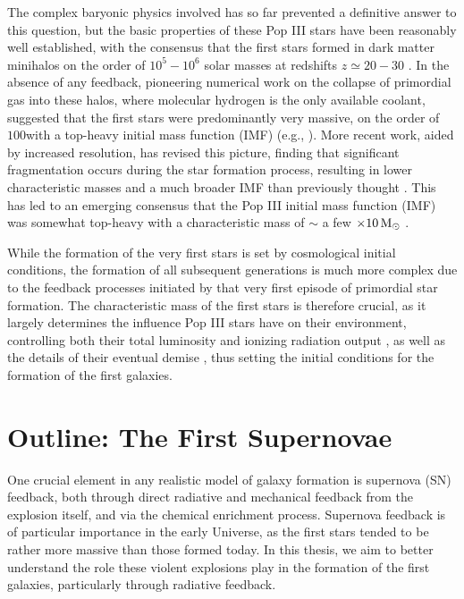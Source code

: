 \documentclass[../thesis.tex]{subfiles}
\begin{document}
The complex baryonic physics involved has so far prevented a definitive answer to this question, but the basic properties of these Pop III stars have been reasonably well established, with the consensus that the first stars formed in dark matter minihalos on the order of $10^5-10^6$ solar masses at redshifts $z \simeq 20-30$ \citep{CouchmanRees1986,   HaimanThoulLoeb1996, Tegmarketal1997}.  
In the absence of any feedback, pioneering numerical work on the collapse of primordial gas into these halos, where molecular hydrogen is the only available coolant, suggested that the first stars were predominantly very massive, on the order of $100$\msun with a top-heavy initial mass function (IMF) (e.g., \citealt{BrommCoppiLarson1999, BrommCoppiLarson2002, AbelBryanNorman2002, BrommLarson2004, Yoshidaetal2006, OSheaNorman2007}).  
More recent work, aided by increased resolution, has revised this picture, finding that significant fragmentation occurs during the star formation process, resulting in lower characteristic masses and a much broader IMF than previously thought \citep{StacyGreifBromm2010,Clarketal2011a,Clarketal2011b,Greifetal2011,Greifetal2012,StacyBromm2013,Hiranoetal2014,Hosokawaetal2015}. This has led to an emerging consensus that the Pop III initial mass function (IMF) was somewhat top-heavy with a characteristic mass of $\sim$ a few $\times 10\,\mathrm{M}_{\odot}$ \citep{Bromm2013}. 

While the formation of the very first stars is set by cosmological initial conditions, the formation of all subsequent generations is much more complex due to the feedback processes initiated by that very first episode of primordial star formation.
The characteristic mass of the first stars is therefore crucial, as it largely determines the influence Pop III stars have on their environment, controlling both their total luminosity and ionizing radiation output \citep{Schaerer2002}, as well as the details of their eventual demise \citep{Hegeretal2003,HegerWoosley2010,MaederMeynet2012}, thus setting the initial conditions for the formation of the first galaxies.

\section{Outline: The First Supernovae}
One crucial element in any realistic model of galaxy formation is supernova (SN) feedback, both through direct radiative and mechanical feedback from the explosion itself, and via the chemical enrichment process. 
Supernova feedback is of particular importance in the early Universe, as the first stars tended to be rather more massive than those formed today. 
In this thesis, we aim to better understand the role these violent explosions play in the formation of the first galaxies, particularly through radiative feedback.
\end{document}
